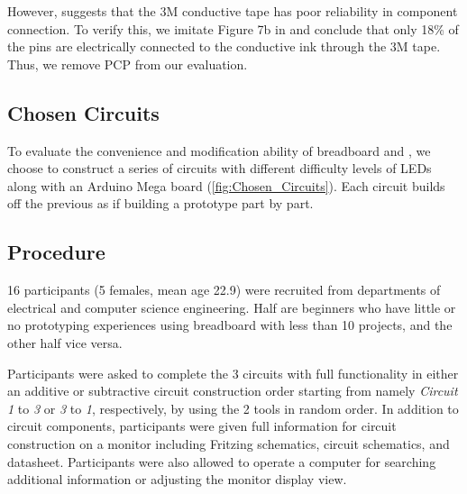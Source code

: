 However, \cite{Circuit_Stickers} suggests that the 3M conductive tape has poor reliability in component connection. To verify this, we imitate Figure 7b in \cite{Instant_Inkjet_Circuits} and conclude that only 18\% of the pins are electrically connected to the conductive ink through the 3M tape. Thus, we remove PCP from our evaluation.



\subsection{Chosen Circuits}

To evaluate the convenience and modification ability of breadboard and \papertitle, we choose to construct a series of circuits with different difficulty levels of LEDs along with an Arduino Mega board (\autoref{fig:Chosen_Circuits}). Each circuit builds off the previous as if building a prototype part by part.

\subsection{Procedure}

16 participants (5 females, mean age 22.9) were recruited from departments of electrical and computer science engineering. Half are beginners who have little or no prototyping experiences using breadboard with less than 10 projects, and the other half vice versa.

Participants were asked to complete the 3 circuits with full functionality in either an additive or subtractive circuit construction order starting from namely \textit{Circuit 1} to \textit{3} or \textit{3} to \textit{1}, respectively, by using the 2 tools in random order. In addition to circuit components, participants were given full information for circuit construction on a monitor including Fritzing schematics, circuit schematics, and datasheet. Participants were also allowed to operate a computer for searching additional information or adjusting the monitor display view.

